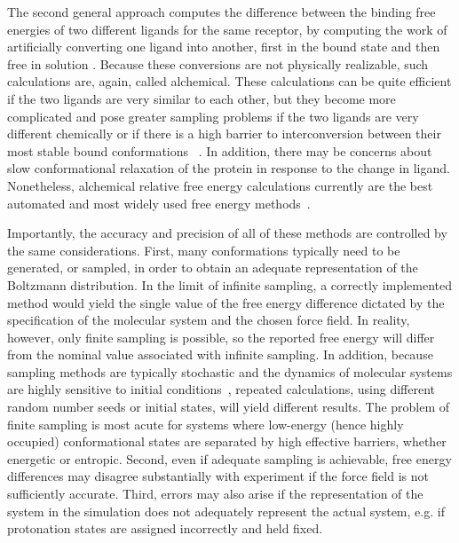 \documentclass[aps,pre,twocolumn,nofootinbib,superscriptaddress,10pt, final,tightenlines]{revtex4-1}
\begin{document}
The second general approach computes the difference between the binding free energies of two different ligands for the same receptor, by computing the work of artificially converting one ligand into another, first in the bound state and then free in solution \cite{tembe_ligand_1984, michel_prediction_2010, christ_basic_2010,  chodera_alchemical_2011}. 
Because these conversions are not physically realizable, such calculations are, again, called alchemical. These calculations can be quite efficient if the two ligands are very similar to each other, but they become more complicated and pose greater sampling problems if the two ligands are very different chemically or if there is a high barrier to interconversion between their most stable bound conformations ~\cite{liu_lead_2013}. 
In addition, there may be concerns about slow conformational relaxation of the protein in response to the change in ligand. 
Nonetheless, alchemical relative free energy calculations currently are the best automated and most widely used free energy methods~\cite{mobley_perspective_2012, liu_lead_2013, schrodinger_accurate_2015}.

Importantly, the accuracy and precision of all of these methods are controlled by the same considerations.
First, many conformations typically need to be generated, or sampled, in order to obtain an adequate representation of the Boltzmann distribution. 
In the limit of infinite sampling, a correctly implemented method would yield the single value of the free energy difference dictated by the specification of the molecular system and the chosen force field. 
In reality, however, only finite sampling is possible, so the reported free energy will differ from the nominal value associated with infinite sampling. 
In addition, because sampling methods are typically stochastic and the dynamics of molecular systems are highly sensitive to initial conditions~\cite{allen_computer_1989}, repeated calculations, using different random number seeds or initial states, will yield different results. 
The problem of finite sampling is most acute for systems where low-energy (hence highly occupied) conformational states are separated by high effective barriers, whether energetic or entropic. 
Second, even if adequate sampling is achievable, free energy differences may disagree substantially with experiment if the force field is not sufficiently accurate. 
Third, errors may also arise if the representation of the system in the simulation does not adequately represent the actual system, e.g. if protonation states are assigned incorrectly and held fixed.  
\end{document}
